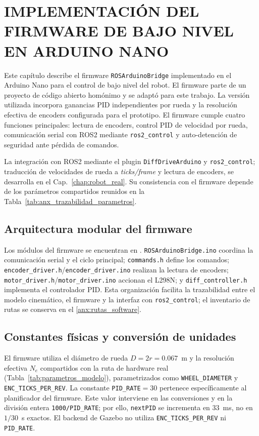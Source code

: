 \chapter{IMPLEMENTACIÓN DEL FIRMWARE DE BAJO NIVEL EN ARDUINO NANO}
\label{ch:setup_arduino}

Este capítulo describe el firmware \texttt{ROSArduinoBridge} implementado en el \gls{Arduino} Nano para el control de bajo nivel del robot. El firmware parte de un proyecto de código abierto homónimo y se adaptó para este trabajo. La versión utilizada incorpora ganancias PID independientes por rueda y la resolución efectiva de encoders configurada para el prototipo. El firmware cumple cuatro funciones principales: lectura de encoders, control PID de velocidad por rueda, comunicación serial con \gls{ROS2} mediante \texttt{ros2\_control} y auto-detención de seguridad ante pérdida de comandos.

La integración con \gls{ROS2} mediante el plugin \texttt{DiffDriveArduino} y \texttt{ros2\_control}; traducción de velocidades de rueda a \textit{ticks/frame} y lectura de encoders, se desarrolla en el Cap.~\ref{chap:robot_real}. Su consistencia con el firmware depende de los parámetros compartidos reunidos en la Tabla~\ref{tab:anx_trazabilidad_parametros}.

\section{Arquitectura modular del firmware}

Los módulos del firmware se encuentran en . \texttt{ROSArduinoBridge.ino} coordina la comunicación serial y el ciclo principal; \texttt{commands.h} define los comandos; \texttt{encoder\_driver.h}/\texttt{encoder\_driver.ino} realizan la lectura de encoders; \texttt{motor\_driver.h}/\texttt{motor\_driver.ino} accionan el L298N; y \texttt{diff\_controller.h} implementa el controlador PID. Esta organización facilita la trazabilidad entre el modelo cinemático, el firmware y la interfaz con \texttt{ros2\_control}; el inventario de rutas se conserva en el \ref{anx:rutas_software}.

\section{Constantes físicas y conversión de unidades}

El firmware utiliza el diámetro de rueda $D=2r=0.067$~m y la resolución efectiva $N_e$ compartidos con la ruta de hardware real (Tabla~\ref{tab:parametros_modelo}), parametrizados como \texttt{WHEEL\_DIAMETER} y \texttt{ENC\_TICKS\_PER\_REV}. La constante \texttt{PID\_RATE}$=30$ pertenece específicamente al planificador del firmware. Este valor interviene en las conversiones y en la división entera \texttt{1000/PID\_RATE}; por ello, \texttt{nextPID} se incrementa en 33~ms, no en $1/30$~s exactos. El backend de Gazebo no utiliza \texttt{ENC\_TICKS\_PER\_REV} ni \texttt{PID\_RATE}.


